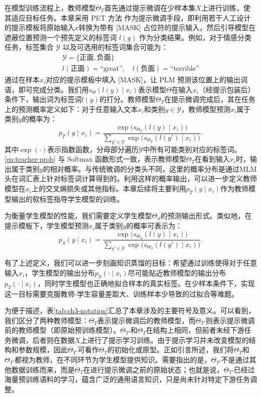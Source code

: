 \documentclass[../main.tex]{subfiles}
\begin{document}
在模型训练流程上，教师模型$\Theta_T$首先通过提示微调在少样本集$X$上进行训练，使其适应目标任务。本章采用 PET 方法\cite{exploitingclozequestions_schick_2021} 作为提示微调手段，即利用若干人工设计的提示模板将原始输入$x$转换为带有 [MASK] 占位符的提示输入，然后引导模型在遮蔽位置预测一个预先定义的标签词 $l(y)$ 作为分类结果。例如，对于情感分类任务，标签集合 $\mathcal{Y}$ 以及可选用的标签词集合可能为：
\begin{gather}
	\mathcal{Y}=\{\text{正面}, \text{负面}\} \\
	l(\text{正面})=\text{“great”},\quad l(\text{负面})=\text{“terrible”}
\end{gather}
通过在样本$x_i$对应的提示模板中填入 [MASK]，让 PLM 预测该位置上的输出词语，即可完成分类。我们用$s_{\Theta}(l(y)\mid x_i)$表示模型$\Theta$在输入$x_i$（经提示包装后）条件下，输出词为标签词$l(y)$的打分。教师模型$\Theta_T$在提示微调完成后，其在任务上的预测概率定义如下：对于任意输入文本$x_i$和类别$y\in\mathcal{Y}$，教师模型预测$x_i$属于类别$y$的概率为：
\begin{equation}
	\label{eq:teacher-prob}
	p_{T}(y \mid x_i) = \frac{\exp\big(s_{\Theta_T}(l(y)\mid x_i)\big)}{\displaystyle\sum_{y' \in \mathcal{Y}} \exp\big(s_{\Theta_T}(l(y')\mid x_i)\big)} .
\end{equation}
其中$\exp(\cdot)$表示指数函数，分母部分遍历$\mathcal{Y}$中所有可能类别对应的标签词。\eqref{eq:teacher-prob} 与 Softmax 函数形式一致，表示教师模型$\Theta_T$在看到输入$x_i$时，输出属于类别$y$的相对概率。与传统微调的分类头不同，这里的概率分布是通过MLM头在词汇表上针对标签词计算得到的。利用这样的概率输出，可以进一步定义教师模型在$x_i$上的交叉熵损失或其他指标。本章后续将主要利用$p_T(y\mid x_i)$作为教师模型输出的软标签指导学生模型的训练。

为衡量学生模型的性能，我们需要定义学生模型$\Theta_S$的预测输出形式。类似地，在提示模板下，学生模型预测$x_i$属于类别$y$的概率可表示为：
\begin{equation}
	\label{eq:student-prob}
	p_{S}(y \mid x_i) = \frac{\exp\big(s_{\Theta_S}(l(y)\mid x_i)\big)}{\displaystyle\sum_{y' \in \mathcal{Y}} \exp\big(s_{\Theta_S}(l(y')\mid x_i)\big)} .
\end{equation}

有了上述定义，我们可以进一步刻画知识蒸馏的目标：希望通过训练使得对于任意输入$x_i$，学生模型的输出分布$p_S(\cdot \mid x_i)$尽可能贴近教师模型的输出分布$p_T(\cdot \mid x_i)$，同时学生模型也正确地拟合样本的真实标签。在少样本条件下，实现这一目标需要克服教师-学生容量差距大、训练样本少导致的过拟合等难题。

为便于描述，表\ref{tab:ch3-notation}汇总了本章涉及的主要符号及意义。可以看到，我们区分了两种教师模型：$\Theta_T$表示提示微调后的教师模型，而$\Theta_{T'}$则表示提示微调前的教师模型（即原始预训练模型）。$\Theta_{T'}$和$\Theta_T$在结构上相同，但前者未经下游任务微调，后者则在数据$X$上进行了提示学习训练。由于提示学习并未改变模型的结构和参数规模，因此$\Theta_{T'}$可看作$\Theta_T$的初始化或原型。正如引言所述，我们将$\Theta_T$和$\Theta_{T'}$都视为教师，在不同环节为学生模型提供知识。需要指出的是，$\Theta_{T'}$不是通过其他数据训练而来，而是$\Theta_T$在进行提示微调之前的原始状态；也就是说，$\Theta_{T'}$已经过海量预训练语料的学习，蕴含广泛的通用语言知识，只是尚未针对特定下游任务调整。
\end{document}
